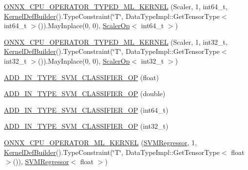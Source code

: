 \begin{DoxyCompactItemize}
\item 
\mbox{\hyperlink{namespaceonnxruntime_1_1ml_a60a7dad09efd5ac312b90d7abbde7db2}{O\+N\+N\+X\+\_\+\+C\+P\+U\+\_\+\+O\+P\+E\+R\+A\+T\+O\+R\+\_\+\+T\+Y\+P\+E\+D\+\_\+\+M\+L\+\_\+\+K\+E\+R\+N\+EL}} (Scaler, 1, int64\+\_\+t, \mbox{\hyperlink{classonnxruntime_1_1KernelDefBuilder}{Kernel\+Def\+Builder}}().Type\+Constraint(\char`\"{}T\char`\"{}, Data\+Type\+Impl\+::\+Get\+Tensor\+Type$<$ int64\+\_\+t $>$()).May\+Inplace(0, 0), \mbox{\hyperlink{classonnxruntime_1_1ml_1_1ScalerOp}{Scaler\+Op}}$<$ int64\+\_\+t $>$)
\item 
\mbox{\hyperlink{namespaceonnxruntime_1_1ml_a2ae1c61799a9310ef229f066db2ccdc5}{O\+N\+N\+X\+\_\+\+C\+P\+U\+\_\+\+O\+P\+E\+R\+A\+T\+O\+R\+\_\+\+T\+Y\+P\+E\+D\+\_\+\+M\+L\+\_\+\+K\+E\+R\+N\+EL}} (Scaler, 1, int32\+\_\+t, \mbox{\hyperlink{classonnxruntime_1_1KernelDefBuilder}{Kernel\+Def\+Builder}}().Type\+Constraint(\char`\"{}T\char`\"{}, Data\+Type\+Impl\+::\+Get\+Tensor\+Type$<$ int32\+\_\+t $>$()).May\+Inplace(0, 0), \mbox{\hyperlink{classonnxruntime_1_1ml_1_1ScalerOp}{Scaler\+Op}}$<$ int32\+\_\+t $>$)
\item 
\mbox{\hyperlink{namespaceonnxruntime_1_1ml_a2d4ac19837d15bd1aa23d5c0b5c5a3bd}{A\+D\+D\+\_\+\+I\+N\+\_\+\+T\+Y\+P\+E\+\_\+\+S\+V\+M\+\_\+\+C\+L\+A\+S\+S\+I\+F\+I\+E\+R\+\_\+\+OP}} (float)
\item 
\mbox{\hyperlink{namespaceonnxruntime_1_1ml_ae2e8618ef59921a82167b291d3935573}{A\+D\+D\+\_\+\+I\+N\+\_\+\+T\+Y\+P\+E\+\_\+\+S\+V\+M\+\_\+\+C\+L\+A\+S\+S\+I\+F\+I\+E\+R\+\_\+\+OP}} (double)
\item 
\mbox{\hyperlink{namespaceonnxruntime_1_1ml_aeaaccc638222f08f55f156c0b491aed5}{A\+D\+D\+\_\+\+I\+N\+\_\+\+T\+Y\+P\+E\+\_\+\+S\+V\+M\+\_\+\+C\+L\+A\+S\+S\+I\+F\+I\+E\+R\+\_\+\+OP}} (int64\+\_\+t)
\item 
\mbox{\hyperlink{namespaceonnxruntime_1_1ml_a94ed8b6ea413625aa2da3af611b7b547}{A\+D\+D\+\_\+\+I\+N\+\_\+\+T\+Y\+P\+E\+\_\+\+S\+V\+M\+\_\+\+C\+L\+A\+S\+S\+I\+F\+I\+E\+R\+\_\+\+OP}} (int32\+\_\+t)
\item 
\mbox{\hyperlink{namespaceonnxruntime_1_1ml_ae2f29cf14d162850dc318c2c7ddeeca0}{O\+N\+N\+X\+\_\+\+C\+P\+U\+\_\+\+O\+P\+E\+R\+A\+T\+O\+R\+\_\+\+M\+L\+\_\+\+K\+E\+R\+N\+EL}} (\mbox{\hyperlink{classonnxruntime_1_1ml_1_1SVMRegressor}{S\+V\+M\+Regressor}}, 1, \mbox{\hyperlink{classonnxruntime_1_1KernelDefBuilder}{Kernel\+Def\+Builder}}().Type\+Constraint(\char`\"{}T\char`\"{}, Data\+Type\+Impl\+::\+Get\+Tensor\+Type$<$ float $>$()), \mbox{\hyperlink{classonnxruntime_1_1ml_1_1SVMRegressor}{S\+V\+M\+Regressor}}$<$ float $>$)

\end{DoxyCompactItemize}
